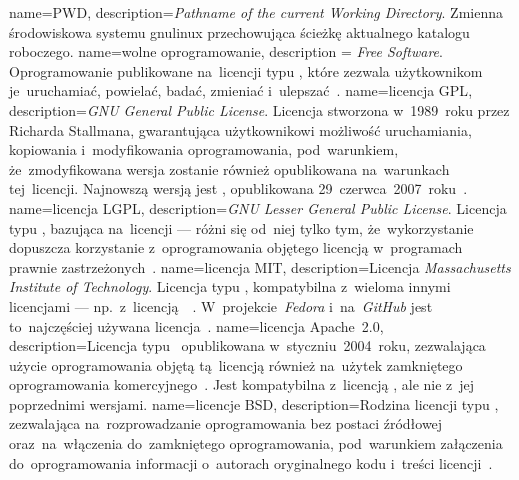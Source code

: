 {
	name={PWD},
	description={\emph{Pathname of the current Working Directory}. Zmienna środowiskowa systemu \gls{gnulinux} przechowująca ścieżkę aktualnego katalogu roboczego.}
}
{
	name={wolne oprogramowanie},
	description = {\emph{Free Software}. Oprogramowanie publikowane na~licencji typu , które zezwala użytkownikom je~uruchamiać, powielać, badać, zmieniać i~ulepszać~\cite{free-software}.}
}
{
	name={licencja GPL},
	description={\emph{GNU General Public License}. Licencja  stworzona w~1989~roku przez Richarda Stallmana, gwarantująca użytkownikowi możliwość uruchamiania, kopiowania i~modyfikowania oprogramowania, pod~warunkiem, że~zmodyfikowana wersja zostanie również opublikowana na~warunkach tej~licencji. Najnowszą wersją  jest , opublikowana 29~czerwca~2007~roku~\cite{gpl3,wiki:licenses-comparison}.}
}
{
	name={licencja LGPL},
	description={\emph{GNU Lesser General Public License}. Licencja typu , bazująca na~licencji  --- różni się od~niej tylko tym, że~wykorzystanie  dopuszcza korzystanie z~oprogramowania objętego licencją w~programach prawnie zastrzeżonych~\cite{lgpl3,why-not-lgpl,wiki:licenses-comparison}.}
}
{
	name={licencja MIT},
	description={Licencja \emph{Massachusetts Institute of Technology}. Licencja typu , kompatybilna z~wieloma innymi  licencjami --- np.~z~licencją~~\cite{mit}. W~projekcie~\emph{Fedora} i~na~\emph{GitHub} jest to~najczęściej używana licencja~\cite{mit-popularity-fedora,mit-popularity-github,wiki:licenses-comparison}.}
}
{
	name={licencja Apache~2.0},
	description={Licencja typu ~opublikowana w~styczniu~2004~roku, zezwalająca użycie oprogramowania objętą tą~licencją również na~użytek zamkniętego oprogramowania komercyjnego~\cite{apache2.0,wiki:licenses-comparison}. Jest kompatybilna z~licencją , ale nie z~jej poprzednimi wersjami.}
}
{
	name={licencje BSD},
	description={Rodzina licencji typu , zezwalająca na~rozprowadzanie oprogramowania bez postaci źródłowej oraz~na~włączenia do~zamkniętego oprogramowania, pod~warunkiem załączenia do~oprogramowania informacji o~autorach oryginalnego kodu i~treści licencji~\cite{bsd,wiki:licenses-comparison}.}
}

